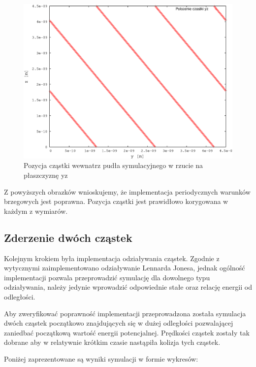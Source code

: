 \documentclass[a4paper,10pt]{article}
\begin{document}
\begin{figure}[h]
\begin{center}
\includegraphics[scale=0.6]{wyniki/one-particle-yz.eps}
\caption{Pozycja cząstki wewnatrz pudła symulacyjnego w rzucie na płaszczyznę yz}
\label{pic:one-yz}
\end{center}
\end{figure}
\FloatBarrier

Z powyższych obrazków wnioskujemy, że implementacja periodycznych warunków brzegowych jest poprawna. Pozycja cząstki jest prawidłowo korygowana w każdym z wymiarów.

\subsection{Zderzenie dwóch cząstek}

Kolejnym krokiem była implementacja odziaływania cząstek. Zgodnie z wytycznymi zaimplementowano odziaływanie Lennarda Jonesa, jednak ogólność implementacji pozwala przeprowadzić symulację dla dowolnego typu odziaływania, należy jedynie wprowadzić odpowiednie stałe oraz relację energii od odległości.

Aby zweryfikować poprawność implementacji przeprowadzona została symulacja dwóch cząstek początkowo znajdujących się w dużej odległości pozwalającej zaniedbać początkową wartość energii potencjalnej. Prędkości cząstek zostały tak dobrane aby w relatywnie krótkim czasie nastąpiła kolizja tych cząstek.

Poniżej zaprezentowane są wyniki symulacji w formie wykresów:
\end{document}
